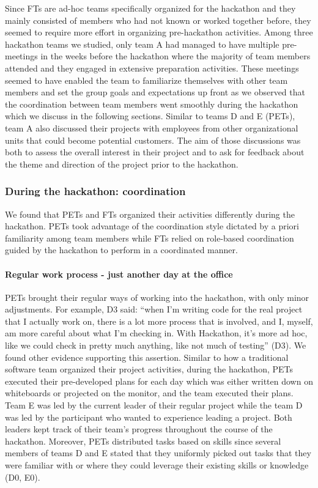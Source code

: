 \documentclass{hcij}
\begin{document}
Since FTs are ad-hoc teams specifically organized for the hackathon and they mainly consisted of members who had not known or worked together before, they seemed to require more effort in organizing pre-hackathon activities. Among three hackathon teams we studied, only team A had managed to have multiple pre-meetings in the weeks before the hackathon where the majority of team members attended and they engaged in extensive preparation activities. These meetings seemed to have enabled the team to familiarize themselves with other team members and set the group goals and expectations up front as we observed that the coordination between team members went smoothly during the hackathon which we discuss in the following sections.  Similar to teams D and E (PETs), team A also discussed their projects with employees from other organizational units that could become potential customers. The aim of those discussions was both to assess the overall interest in their project and to ask for feedback about the theme and direction of the project prior to the hackathon.

\subsubsection{During the hackathon: coordination}
We found that PETs and FTs organized their activities differently during the hackathon. PETs took advantage of the coordination style dictated by a priori familiarity among team members while FTs relied on role-based coordination guided by the hackathon to perform in a coordinated manner.

\paragraph{Regular work process - just another day at the office}
PETs brought their regular ways of working into the hackathon, with only minor adjustments. For example, D3 said: “when I'm writing code for the real project that I actually work on, there is a lot more process that is involved, and I, myself, am more careful about what I'm checking in. With Hackathon, it's more ad hoc, like we could check in pretty much anything, like not much of testing” (D3). We found other evidence supporting this assertion. Similar to how a traditional software team organized their project activities, during the hackathon, PETs executed their pre-developed plans for each day which was either written down on whiteboards or projected on the monitor, and the team executed their plans. Team E was led by the current leader of their regular project while the team D was led by the participant who wanted to experience leading a project. Both leaders kept track of their team’s progress throughout the course of the hackathon. Moreover, PETs distributed tasks based on skills since several members of teams D and E stated that they uniformly picked out tasks that they were familiar with or where they could leverage their existing skills or knowledge (D0, E0).
\end{document}
